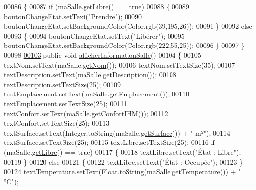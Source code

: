 \begin{DoxyCode}
00086     \{
00087         \textcolor{keywordflow}{if} (maSalle.\hyperlink{classcom_1_1lasalle_1_1meeting_1_1_salle_adc0c4936355bc0ae22991f69c12a5e42}{getLibre}() == \textcolor{keyword}{true})
00088         \{
00089             boutonChangeEtat.setText(\textcolor{stringliteral}{"Prendre"});
00090             boutonChangeEtat.setBackgroundColor(Color.rgb(39,195,26));
00091         \}
00092         \textcolor{keywordflow}{else}
00093         \{
00094             boutonChangeEtat.setText(\textcolor{stringliteral}{"Libérer"});
00095             boutonChangeEtat.setBackgroundColor(Color.rgb(222,55,25));
00096         \}
00097     \}
00098 
\hyperlink{classcom_1_1lasalle_1_1meeting_1_1_salle_activity_aee6f0cd7a9029d5fbe12bf85c2316f82}{00103}     \textcolor{keyword}{public} \textcolor{keywordtype}{void} \hyperlink{classcom_1_1lasalle_1_1meeting_1_1_salle_activity_aee6f0cd7a9029d5fbe12bf85c2316f82}{afficherInformationSalle}()
00104     \{
00105         textNom.setText(maSalle.\hyperlink{classcom_1_1lasalle_1_1meeting_1_1_salle_a49d977f69b2783e8ad57eccffc29e97b}{getNom}());
00106         textNom.setTextSize(35);
00107         textDescription.setText(maSalle.\hyperlink{classcom_1_1lasalle_1_1meeting_1_1_salle_a253315cc4da23a4b8ab092e10be6d13d}{getDescription}());
00108         textDescription.setTextSize(25);
00109         textEmplacement.setText(maSalle.\hyperlink{classcom_1_1lasalle_1_1meeting_1_1_salle_ac58600d946b6553858cc41be032473cd}{getEmplacement}());
00110         textEmplacement.setTextSize(25);
00111         textConfort.setText(maSalle.\hyperlink{classcom_1_1lasalle_1_1meeting_1_1_salle_abf1f96423a1df46ba4d6ac4a1b6d0c34}{getConfortIHM}());
00112         textConfort.setTextSize(25);
00113         textSurface.setText(Integer.toString(maSalle.\hyperlink{classcom_1_1lasalle_1_1meeting_1_1_salle_ad9dad6b4cfeb020195d4cde268af885f}{getSurface}()) + \textcolor{stringliteral}{" m²"});
00114         textSurface.setTextSize(25);
00115         textLibre.setTextSize(25);
00116         \textcolor{keywordflow}{if} (maSalle.\hyperlink{classcom_1_1lasalle_1_1meeting_1_1_salle_adc0c4936355bc0ae22991f69c12a5e42}{getLibre}() == \textcolor{keyword}{true})
00117         \{
00118             textLibre.setText(\textcolor{stringliteral}{"État : Libre"});
00119         \}
00120         \textcolor{keywordflow}{else}
00121         \{
00122             textLibre.setText(\textcolor{stringliteral}{"État : Occupée"});
00123         \}
00124         textTemperature.setText(Float.toString(maSalle.\hyperlink{classcom_1_1lasalle_1_1meeting_1_1_salle_ae3235f548f8bc7ab4d05ff38ec762e77}{getTemperature}()) + \textcolor{stringliteral}{" °C"});

\end{DoxyCode}
